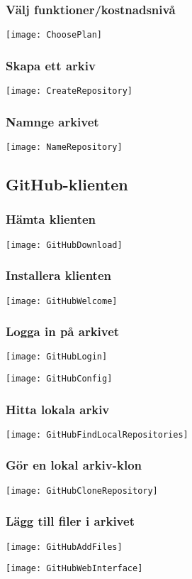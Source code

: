 \documentclass[swedish]{beamer}
\begin{document}
\begin{frame}[fragile]
\frametitle{Välj funktioner/kostnadsnivå}
\texttt{[image: ChoosePlan]}
\end{frame}


\begin{frame}[fragile]
\frametitle{Skapa ett arkiv}
\texttt{[image: CreateRepository]}  
\end{frame}

\begin{frame}[fragile]
\frametitle{Namnge arkivet}
\texttt{[image: NameRepository]}
\end{frame}

\subsection{GitHub-klienten}
\begin{frame}[fragile]
\frametitle{Hämta klienten}
\texttt{[image: GitHubDownload]}

\end{frame}

\begin{frame}[fragile]
\frametitle{Installera klienten}
\texttt{[image: GitHubWelcome]}
\end{frame}

\begin{frame}[fragile]
\frametitle{Logga in på arkivet}
\texttt{[image: GitHubLogin]}
\end{frame}

\begin{frame}[fragile]
\texttt{[image: GitHubConfig]}
\end{frame}

\begin{frame}[fragile]
\frametitle{Hitta lokala arkiv}
\texttt{[image: GitHubFindLocalRepositories]}
\end{frame}

\begin{frame}
\frametitle{Gör en lokal arkiv-klon}
\texttt{[image: GitHubCloneRepository]}
\end{frame}

\begin{frame}[fragile]
\frametitle{Lägg till filer i arkivet}
\texttt{[image: GitHubAddFiles]}
\end{frame}

\begin{frame}[fragile]
\texttt{[image: GitHubWebInterface]}
\end{frame}
\end{document}
